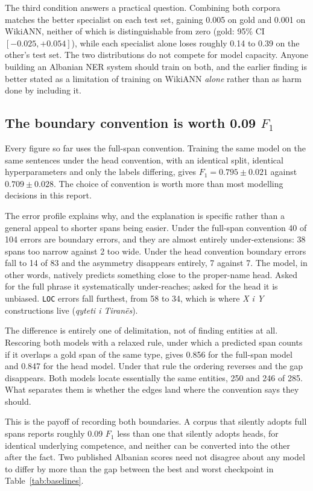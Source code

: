 The third condition answers a practical question. Combining both corpora matches the better specialist on each test set, gaining 0.005 on gold and 0.001 on WikiANN, neither of which is distinguishable from zero (gold: 95\% CI $[-0.025, +0.054]$), while each specialist alone loses roughly 0.14 to 0.39 on the other's test set. The two distributions do not compete for model capacity. Anyone building an Albanian NER system should train on both, and the earlier finding is better stated as a limitation of training on WikiANN \emph{alone} rather than as harm done by including it.

\subsection{The boundary convention is worth 0.09 $F_1$}
\label{sec:results:head}

Every figure so far uses the full-span convention. Training the same model on the same sentences under the head convention, with an identical split, identical hyperparameters and only the labels differing, gives $F_1 = 0.795 \pm 0.021$ against $0.709 \pm 0.028$. The choice of convention is worth more than most modelling decisions in this report.

The error profile explains why, and the explanation is specific rather than a general appeal to shorter spans being easier. Under the full-span convention 40 of 104 errors are boundary errors, and they are almost entirely under-extensions: 38 spans too narrow against 2 too wide. Under the head convention boundary errors fall to 14 of 83 and the asymmetry disappears entirely, 7 against 7. The model, in other words, natively predicts something close to the proper-name head. Asked for the full phrase it systematically under-reaches; asked for the head it is unbiased. \texttt{LOC} errors fall furthest, from 58 to 34, which is where \emph{X i Y} constructions live (\emph{qyteti i Tiran\"es}).

The difference is entirely one of delimitation, not of finding entities at all. Rescoring both models with a relaxed rule, under which a predicted span counts if it overlaps a gold span of the same type, gives 0.856 for the full-span model and 0.847 for the head model. Under that rule the ordering reverses and the gap disappears. Both models locate essentially the same entities, 250 and 246 of 285. What separates them is whether the edges land where the convention says they should.

This is the payoff of recording both boundaries. A corpus that silently adopts full spans reports roughly 0.09 $F_1$ less than one that silently adopts heads, for identical underlying competence, and neither can be converted into the other after the fact. Two published Albanian scores need not disagree about any model to differ by more than the gap between the best and worst checkpoint in Table~\ref{tab:baselines}.

